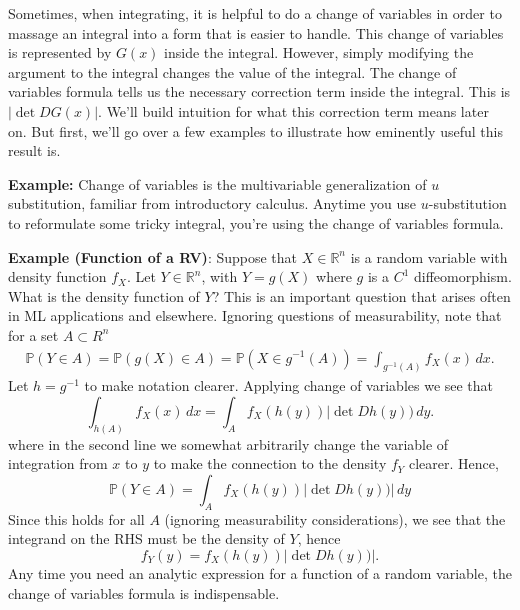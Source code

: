 \documentclass{book}
\newcommand{\dx}{\, dx}
\newcommand{\dy}{\, dy}
\newcommand{\R}{\mathbb{R}}
\renewcommand{\P}{\mathbb{P}}
\begin{document}
Sometimes, when integrating, it is helpful to do a change of variables in order to massage an integral into a form that is easier to handle. This change of variables is represented by $G(x)$ inside the integral. However, simply modifying the argument to the integral changes the value of the integral. The change of variables formula tells us the necessary correction term inside the integral. This is $\left| \det DG(x)\right| $. We'll build intuition for what this correction term means later on. But first, we'll go over a few examples to illustrate how eminently useful this result is. 

\vspace{1em}
\noindent 
\textbf{Example:} Change of variables is the multivariable generalization of $u$ substitution, familiar from introductory calculus. Anytime you use $u$-substitution to reformulate some tricky integral, you're using the change of variables formula.  

\vspace{1em} \noindent 
\textbf{Example (Function of a RV)}: Suppose that $X \in \R^n$ is a random variable with density function $f_X$. Let $Y\in \R^n$, with $Y = g(X)$ where $g$ is a $C^1$ diffeomorphism. What is the density function of $Y$? This is an important question that arises often in ML applications and elsewhere. Ignoring questions of measurability, note that for a set $A\subset R^n$ 
\begin{align}
\P(Y \in A) = \P(g(X) \in A) = \P(X \in g^{-1}(A)) = \int_{g^{-1}(A)} f_X(x)\dx. 
\end{align}
Let $h =g^{-1}$ to make notation clearer. Applying change of variables we see that
$$
\int_{h(A)} f_X(x)\dx = \int_A f_X(h(y)) |\det Dh(y))\dy. 
$$
where in the second line we somewhat arbitrarily change the variable of integration from $x$ to $y$ to make the connection to the density $f_Y$ clearer.
Hence,
$$
\P(Y\in A) = \int_A f_X(h(y)) |\det Dh(y))|\dy
$$
Since this holds for all $A$ (ignoring measurability considerations), we see that the integrand on the RHS must be the density of $Y$, hence
\begin{equation} \label{eq:pushforwardY} %
f_Y(y) = f_X(h(y)) |\det Dh(y))|.
\end{equation}
Any time you need an analytic expression for a function of a random variable, the change of variables formula is indispensable. 
\end{document}
